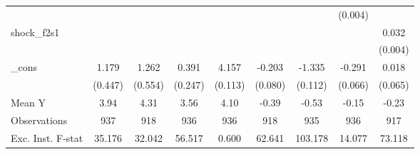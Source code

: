 {\begin{tabular}{l*{8}{c}}
            &                     &                     &                     &                     &                     &                     &     (0.004)         &                     \\
\addlinespace
shock\_f2s1  &                     &                     &                     &                     &                     &                     &                     &       0.032\sym{***}\\
            &                     &                     &                     &                     &                     &                     &                     &     (0.004)         \\
\addlinespace
\_cons      &       1.179\sym{**} &       1.262\sym{**} &       0.391         &       4.157\sym{***}&      -0.203\sym{**} &      -1.335\sym{***}&      -0.291\sym{***}&       0.018         \\
            &     (0.447)         &     (0.554)         &     (0.247)         &     (0.113)         &     (0.080)         &     (0.112)         &     (0.066)         &     (0.065)         \\
\midrule
Mean Y      &        3.94         &        4.31         &        3.56         &        4.10         &       -0.39         &       -0.53         &       -0.15         &       -0.23         \\
Observations&         937         &         918         &         936         &         936         &         918         &         935         &         936         &         917         \\
Exc. Inst. F-stat&      35.176         &      32.042         &      56.517         &       0.600         &      62.641         &     103.178         &      14.077         &      73.118         \\
\bottomrule
\end{tabular}
}
